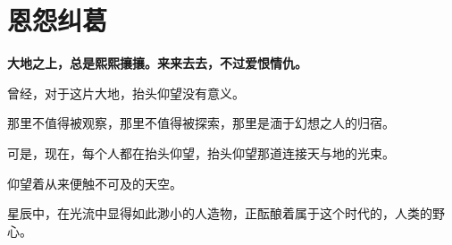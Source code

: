 \documentclass[openany]{book}
\begin{document}
\chapter{恩怨纠葛}
\begin{center} \textbf{大地之上，总是熙熙攘攘。来来去去，不过爱恨情仇。}\end{center} \par
\clearpage
曾经，对于这片大地，抬头仰望没有意义。\par
那里不值得被观察，那里不值得被探索，那里是湎于幻想之人的归宿。\par
可是，现在，每个人都在抬头仰望，抬头仰望那道连接天与地的光束。\par
仰望着从来便触不可及的天空。\par
星辰中，在光流中显得如此渺小的人造物，正酝酿着属于这个时代的，人类的野心。
\end{document}
